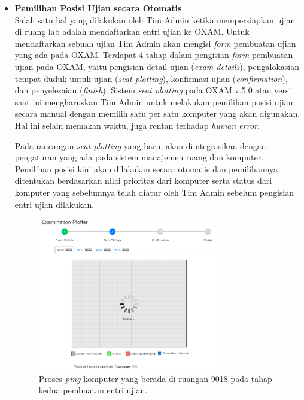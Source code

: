 \documentclass[a4paper,twoside]{article}
\begin{document}
\begin{enumerate}
\begin{itemize}
\begin{itemize}
		        \item \textbf{Pemilihan Posisi Ujian secara Otomatis}\\
		        \setlength\parindent{24pt}
		        Salah satu hal yang dilakukan oleh Tim Admin ketika mempersiapkan ujian di ruang lab adalah mendaftarkan entri ujian ke OXAM. Untuk mendaftarkan sebuah ujian Tim Admin akan mengisi \textit{form} pembuatan ujian yang ada pada OXAM. Terdapat 4 tahap dalam pengisian \textit{form} pembuatan ujian pada OXAM, yaitu pengisian detail ujian (\textit{exam details}), pengalokasian tempat duduk untuk ujian (\textit{seat plotting}), konfirmasi ujian (\textit{confirmation}), dan penyelesaian (\textit{finish}). Sistem \textit{seat plotting} pada OXAM v.5.0 atau versi saat ini mengharuskan Tim Admin untuk melakukan pemilihan posisi ujian secara manual dengan memilih satu per satu komputer yang akan digunakan. Hal ini selain memakan waktu, juga rentan terhadap \textit{human error}. 
		        
		        Pada rancangan \textit{seat plotting} yang baru, akan diintegrasikan dengan pengaturan yang ada pada sistem manajemen ruang dan komputer. Pemilihan posisi kini akan dilakukan secara otomatis dan pemilihannya ditentukan berdasarkan nilai prioritas dari komputer serta status dari komputer yang sebelumnya telah diatur oleh Tim Admin sebelum pengisian entri ujian dilakukan.
		        
                \begin{figure}[H]
                    \centering
                    \includegraphics[width=0.75\textwidth]{images/ui designs/automation/step-2-1-ping-2.png}
                    \caption{Proses \textit{ping} komputer yang berada di ruangan 9018 pada tahap kedua pembuatan entri ujian.}
                    \label{fig:automation-ping-2}
                \end{figure}
                

\end{itemize}
\end{itemize}
\end{enumerate}
\end{document}

